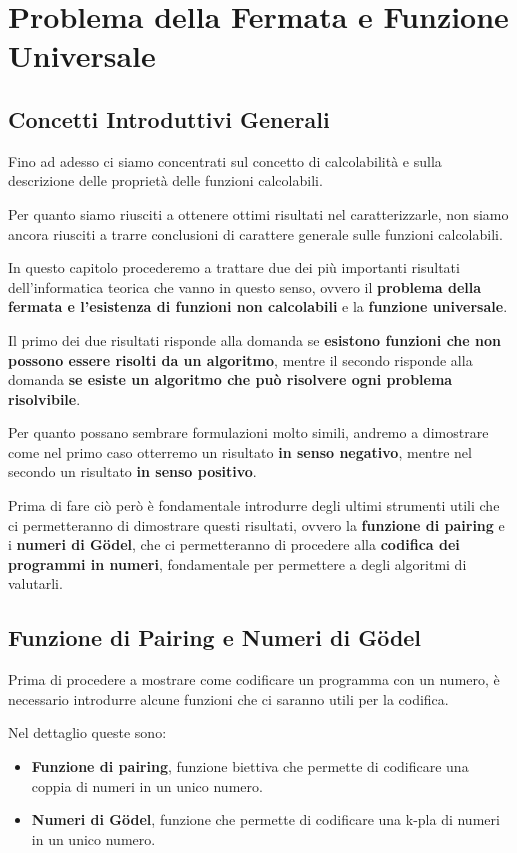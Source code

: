\chapter{Problema della Fermata e Funzione Universale}

\section{Concetti Introduttivi Generali}

Fino ad adesso ci siamo concentrati sul concetto di calcolabilità e sulla descrizione delle proprietà delle funzioni calcolabili.

Per quanto siamo riusciti a ottenere ottimi risultati nel caratterizzarle, non siamo ancora riusciti a trarre conclusioni di carattere generale sulle funzioni calcolabili.

In questo capitolo procederemo a trattare due dei più importanti risultati dell'informatica teorica che vanno in questo senso, ovvero il \textbf{problema della fermata e l'esistenza di funzioni non calcolabili} e la \textbf{funzione universale}.

Il primo dei due risultati risponde alla domanda se \textbf{esistono funzioni che non possono essere risolti da un algoritmo}, mentre il secondo risponde alla domanda \textbf{se esiste un algoritmo che può risolvere ogni problema risolvibile}.

Per quanto possano sembrare formulazioni molto simili, andremo a dimostrare come nel primo caso otterremo un risultato \textbf{in senso negativo}, mentre nel secondo un risultato \textbf{in senso positivo}.

Prima di fare ciò però è fondamentale introdurre degli ultimi strumenti utili che ci permetteranno di dimostrare questi risultati, ovvero la \textbf{funzione di pairing} e i \textbf{numeri di Gödel}, che ci permetteranno di procedere alla \textbf{codifica dei programmi in numeri}, fondamentale per permettere a degli algoritmi di valutarli.

\newpage
\section{Funzione di Pairing e Numeri di Gödel}

Prima di procedere a mostrare come codificare un programma con un numero, è necessario introdurre alcune funzioni che ci saranno utili per la codifica.

Nel dettaglio queste sono:
\begin{itemize}
  \item \textbf{Funzione di pairing}, funzione biettiva che permette di codificare una coppia di numeri in un unico numero.
  \item \textbf{Numeri di Gödel}, funzione che permette di codificare una k-pla di numeri in un unico numero.
\end{itemize}


